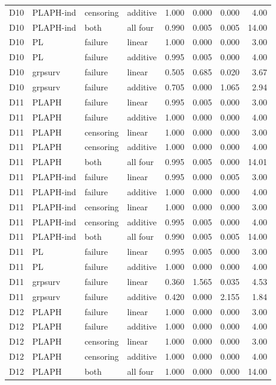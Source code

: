 \begin{longtable}{clllrrrr}
D10 & PLAPH-ind & censoring & additive & 1.000 & 0.000 & 0.000 & 4.00 \\
D10 & PLAPH-ind & both & all four & 0.990 & 0.005 & 0.005 & 14.00 \\
D10 & PL & failure & linear & 1.000 & 0.000 & 0.000 & 3.00 \\
D10 & PL & failure & additive & 0.995 & 0.005 & 0.000 & 4.00 \\
D10 & grpsurv & failure & linear & 0.505 & 0.685 & 0.020 & 3.67 \\
D10 & grpsurv & failure & additive & 0.705 & 0.000 & 1.065 & 2.94 \\
D11 & PLAPH & failure & linear & 0.995 & 0.005 & 0.000 & 3.00 \\
D11 & PLAPH & failure & additive & 1.000 & 0.000 & 0.000 & 4.00 \\
D11 & PLAPH & censoring & linear & 1.000 & 0.000 & 0.000 & 3.00 \\
D11 & PLAPH & censoring & additive & 1.000 & 0.000 & 0.000 & 4.00 \\
D11 & PLAPH & both & all four & 0.995 & 0.005 & 0.000 & 14.01 \\
D11 & PLAPH-ind & failure & linear & 0.995 & 0.000 & 0.005 & 3.00 \\
D11 & PLAPH-ind & failure & additive & 1.000 & 0.000 & 0.000 & 4.00 \\
D11 & PLAPH-ind & censoring & linear & 1.000 & 0.000 & 0.000 & 3.00 \\
D11 & PLAPH-ind & censoring & additive & 0.995 & 0.005 & 0.000 & 4.00 \\
D11 & PLAPH-ind & both & all four & 0.990 & 0.005 & 0.005 & 14.00 \\
D11 & PL & failure & linear & 0.995 & 0.005 & 0.000 & 3.00 \\
D11 & PL & failure & additive & 1.000 & 0.000 & 0.000 & 4.00 \\
D11 & grpsurv & failure & linear & 0.360 & 1.565 & 0.035 & 4.53 \\
D11 & grpsurv & failure & additive & 0.420 & 0.000 & 2.155 & 1.84 \\
D12 & PLAPH & failure & linear & 1.000 & 0.000 & 0.000 & 3.00 \\
D12 & PLAPH & failure & additive & 1.000 & 0.000 & 0.000 & 4.00 \\
D12 & PLAPH & censoring & linear & 1.000 & 0.000 & 0.000 & 3.00 \\
D12 & PLAPH & censoring & additive & 1.000 & 0.000 & 0.000 & 4.00 \\
D12 & PLAPH & both & all four & 1.000 & 0.000 & 0.000 & 14.00 \\

\end{longtable}
